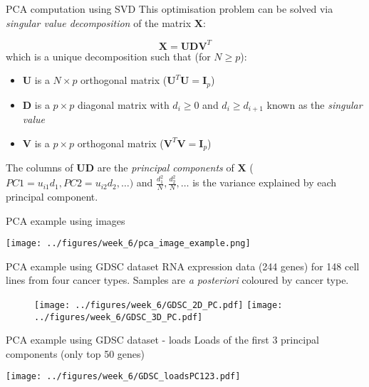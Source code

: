 \documentclass[notes]{beamer}          %
\begin{document}
\begin{frame}{PCA computation using SVD}
This optimisation problem can be solved via \textit{singular value decomposition} of the matrix $\mathbf X$:

\begin{equation*}
\mathbf X = \mathbf{UDV}^T
\end{equation*}
which is a unique decomposition such that (for $N \ge p$):

\begin{itemize}
\item $\mathbf{U}$ is a $N \times p$ orthogonal matrix ($\mathbf{U}^T\mathbf{U}=\mathbf{I}_p$)
\item $\mathbf{D}$ is a $p \times p$ diagonal matrix with $d_i \ge 0$ and $d_{i} \ge d_{i+1}$ known as the \textit{singular value}
\item $\mathbf{V}$ is a $p \times p$ orthogonal matrix ($\mathbf{V}^T\mathbf{V}=\mathbf{I}_p$)

\end{itemize}

The columns of $\mathbf{UD}$ are the \textit{principal components} of $\mathbf{X}$ ($PC1=u_{i1}d_1, PC2=u_{i2}d_2, \dots)$ and $\frac{d_{1}^2}{N}, \frac{d_{2}^2}{N}, \dots$ is the variance explained by each principal component.
\end{frame}

\begin{frame}{PCA example using images}
\begin{center}
\texttt{[image: ../figures/week\_6/pca\_image\_example.png]}  
\end{center}
\end{frame}


\begin{frame}{PCA example using GDSC dataset}
RNA expression data (244 genes) for 148 cell lines from four cancer types. Samples are \textit{a posteriori}  coloured by cancer type.
\begin{figure}
  \texttt{[image: ../figures/week\_6/GDSC\_2D\_PC.pdf]}  
\endminipage\hfill
{}
  \texttt{[image: ../figures/week\_6/GDSC\_3D\_PC.pdf]}  
\endminipage\hfill
\end{figure}
\end{frame}

\begin{frame}{PCA example using GDSC dataset - loads}
Loads of the first 3 principal components (only top 50 genes)
\begin{center}
\texttt{[image: ../figures/week\_6/GDSC\_loadsPC123.pdf]}  
\end{center}
\end{frame}
\end{document}

